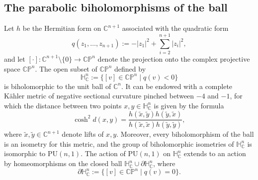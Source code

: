 \documentclass[11pt]{article}
\theoremstyle{definition}
\newcommand{\C}{\mathbb{C}}
\newcommand{\HNC}{\mathbb{H}^{n}_{\C}}
\newcommand{\PHNC}{\partial\mathbb{H}^{n}_{\C}}
\newcommand{\PU}{\mathrm{PU}}
\newcommand{\PNC}{\C \mathbb{P}^{n}}
\def\C{\mathbb{C}}
\newcommand{\HNC}{\mathbb{H}^{n}_{\C}}
\newcommand{\PU}{\mathrm{PU}}
\begin{document}
\subsection{The parabolic biholomorphisms of the ball}\label{ss-section-preli-parab}

Let $h$ be the Hermitian form on $\C^{n+1}$ associated with the quadratic form
\begin{equation*}
q(z_1,\dots,z_{n+1}):=-\lvert z_1\rvert^{2} + \sum_{i=2}^{n+1}\lvert z_i\rvert^{2},
\end{equation*}
and let $[\cdot]:\C^{n+1}\setminus\{0\} \to \PNC$ denote the projection onto the complex projective space $\PNC$. The open subset of $\PNC$ defined by
\begin{equation*}
\HNC:= \{[v]\in \PNC \mid q(v)<0\}
\end{equation*}
is biholomorphic to the unit ball of $\C^{n}$. It can be endowed with a complete Kähler metric of negative sectional curvature pinched between $-4$ and $-1$, for which the distance between two points $x,y\in \HNC$ is given by the formula
\begin{equation*}
\cosh^{2}d(x,y) = \frac{h(\widetilde{x},\widetilde{y}) h(\widetilde{y},\widetilde{x})}{ h(\widetilde{x},\widetilde{x}) h(\widetilde{y},\widetilde{y})},
\end{equation*}
where $\widetilde{x},\widetilde{y}\in \C^{n+1}$ denote lifts of $x,y$. Moreover, every biholomorphism of the ball is an isometry for this metric, and the group of biholomorphic isometries of $\HNC$ is isomorphic to $\PU(n,1)$. The action of $\PU(n,1)$ on $\HNC$ extends to an action by homeomorphisms on the closed ball $\HNC\cup \PHNC$, where
\begin{equation*}
\PHNC:= \{[v]\in \PNC \mid q(v)=0\}.
\end{equation*}
\end{document}
